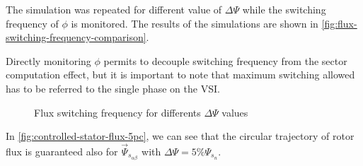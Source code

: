 The simulation was repeated for different value of $\Delta\Psi$ while the switching frequency of $\phi$ is monitored.
The results of the simulations are shown in \autoref{fig:flux-switching-frequency-comparison}.

\begin{nb}
	Directly monitoring $\phi$ permits to decouple switching frequency from the sector computation effect, but it is important to note that maximum switching allowed has to be referred to the single phase on the VSI.
\end{nb}

\begin{figure}[htbp]
	\centering
	\caption{Flux switching frequency for differents $\Delta \Psi$ values}
	\label{fig:flux-switching-frequency-comparison}
\end{figure}

In \autoref{fig:controlled-stator-flux-5pc}, we can see that the circular trajectory of rotor flux is guaranteed also for $\vec{\Psi}_{s_{\alpha\beta}}$ with $\Delta\Psi=5\%\Psi_{s_n}$.

